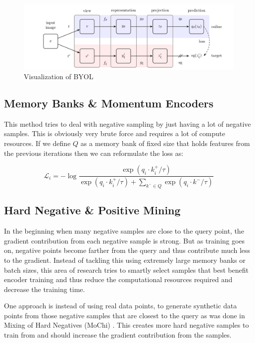 \documentclass[12pt]{article}
\begin{document}
\begin{figure}[h!]
    \begin{center}
        \includegraphics[scale=0.35]{images/byol.png}
        \caption{Visualization of BYOL \cite{grill_bootstrap_nodate}}
    \end{center}
\end{figure}

\subsection{Memory Banks \& Momentum Encoders}
\label{limitations:memory}

This method tries to deal with negative sampling by just having a lot of negative samples. This is obviously very brute force and requires a lot of compute resources. If we define $Q$ as a memory bank of fixed size that holds features from the previous iterations then we can reformulate the loss as:

$$\mathcal{L}_{i} = -\log \frac{\exp(q_{i} \cdot k^{+}_{i} / \tau)}{\exp(q_{i} \cdot k^{+}_{i} / \tau) + \sum_{k^{-} \in Q} \exp(q_{i} \cdot k^{-} / \tau)}$$

\subsection{Hard Negative \& Positive Mining}
\label{limitations:mining}

In the beginning when many negative samples are close to the query point, the gradient contribution from each negative sample is strong. But as training goes on, negative points become farther from the query and thus contribute much less to the gradient. Instead of tackling this using extremely large memory banks or batch sizes, this area of research tries to smartly select samples that best benefit encoder training and thus reduce the computational resources required and decrease the training time.
%

One approach is instead of using real data points, to generate synthetic data points from those negative samples that are closest to the query as was done in Mixing of Hard Negatives (MoChi) \cite{kalantidis_hard_nodate}. This creates more hard negative samples to train from and should increase the gradient contribution from the samples.
%
\end{document}
